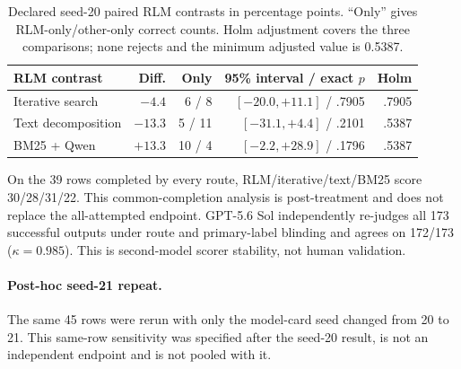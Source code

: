 \begin{table}[!htbp]
\centering
\small
\setlength{\tabcolsep}{1pt}
\begin{tabular}{@{}lrrrr@{}}
\toprule
\textbf{RLM contrast} & \textbf{Diff.} & \textbf{Only} &
\shortstack{\textbf{95\% interval}\\\textbf{/ exact $p$}} & \textbf{Holm} \\
\midrule
Iterative search & $-4.4$ & 6 / 8 & $[-20.0,+11.1]$ / .7905 & .7905 \\
Text decomposition & $-13.3$ & 5 / 11 & $[-31.1,+4.4]$ / .2101 & .5387 \\
BM25 + Qwen & $+13.3$ & 10 / 4 & $[-2.2,+28.9]$ / .1796 & .5387 \\
\bottomrule
\end{tabular}
\caption{Declared seed-20 paired RLM contrasts in percentage points. ``Only''
gives RLM-only/other-only correct counts. Holm adjustment covers the three
comparisons; none rejects and the minimum adjusted value is 0.5387.}
\label{tab:supp-browsecomp-equal-cap-paired}
\end{table}

On the 39 rows completed by every route, RLM/iterative/text/BM25 score
30/28/31/22. This common-completion analysis is post-treatment and does not
replace the all-attempted endpoint. GPT-5.6 Sol independently re-judges all
173 successful outputs under route and primary-label blinding and agrees on
172/173 ($\kappa{=}0.985$). This is second-model scorer stability, not human
validation.

\paragraph{Post-hoc seed-21 repeat.}
The same 45 rows were rerun with only the model-card seed changed from 20 to
21. This same-row sensitivity was specified after the seed-20 result, is not
an independent endpoint and is not pooled with it.

